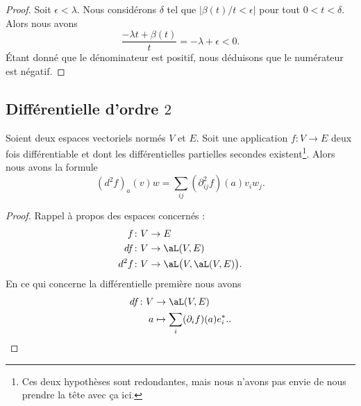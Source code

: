 \begin{proof}
	Soit \( \epsilon<\lambda\). Nous considérons \( \delta\) tel que \( | \beta(t)/t<\epsilon |\) pour tout \( 0<t<\delta\). Alors nous avons
	\begin{equation}
		\frac{ -\lambda t+\beta(t) }{ t }=-\lambda +\epsilon<0.
	\end{equation}
	Étant donné que le dénominateur est positif, nous déduisons que le numérateur est négatif.
\end{proof}


\subsection{Différentielle d'ordre \( 2\)}

\begin{proposition}		\label{PROPooBODMooJHyzup}
	Soient deux espaces vectoriels normés \( V\) et \( E\). Soit une application \(f \colon V\to E  \) deux fois différentiable et dont les différentielles partielles secondes existent\footnote{Ces deux hypothèses sont redondantes, mais nous n'avons pas envie de nous prendre la tête avec ça ici.}. Alors nous avons la formule
	\begin{equation}
		(d^2f)_a(v)w=\sum_{ij}(\partial^2_{ij}f)(a)v_iw_j.
	\end{equation}
\end{proposition}

\begin{proof}
	Rappel à propos des espaces concernés :
	\begin{subequations}
		\begin{align}
			f    & \colon V\to E                          \\
			df   & \colon V\to \aL(V,E)                   \\
			d^2f & \colon V\to \aL\big( V,\aL(V,E) \big).
		\end{align}
	\end{subequations}
	En ce qui concerne la différentielle première nous avons
	\begin{equation}
		\begin{aligned}
			df\colon V & \to \aL(V,E)                          \\
			a          & \mapsto \sum_i(\partial_if)(a)e^*_i..
		\end{aligned}
	\end{equation}
\end{proof}

